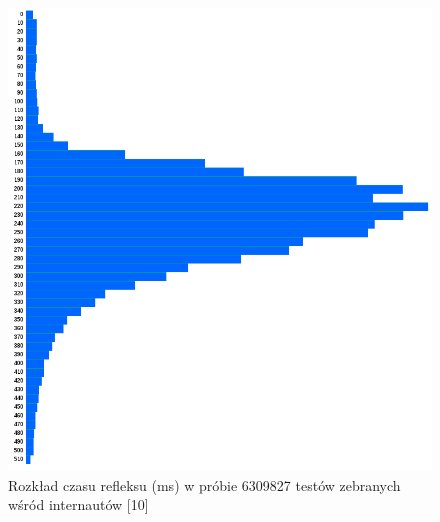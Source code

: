 {\begin{figure}[htb]
\begin{center}
	\includegraphics[]{img/reaction_times}
	\caption{Rozkład czasu refleksu (ms) w próbie 6309827 testów zebranych wśród internautów [10]}
	\label{reaction}
    \end{center}
\end{figure}

}
